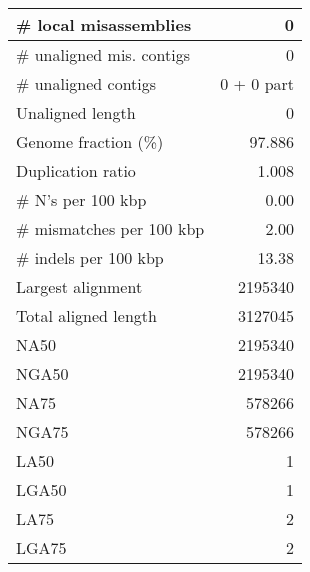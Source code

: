\documentclass[12pt,a4paper]{article}
\begin{document}
\begin{table}[ht]
\begin{center}
\begin{tabular}{|l*{1}{|r}|}
\# local misassemblies & 0 \\ \hline
\# unaligned mis. contigs & 0 \\ \hline
\# unaligned contigs & 0 + 0 part \\ \hline
Unaligned length & 0 \\ \hline
Genome fraction (\%) & 97.886 \\ \hline
Duplication ratio & 1.008 \\ \hline
\# N's per 100 kbp & 0.00 \\ \hline
\# mismatches per 100 kbp & 2.00 \\ \hline
\# indels per 100 kbp & 13.38 \\ \hline
Largest alignment & 2195340 \\ \hline
Total aligned length & 3127045 \\ \hline
NA50 & 2195340 \\ \hline
NGA50 & 2195340 \\ \hline
NA75 & 578266 \\ \hline
NGA75 & 578266 \\ \hline
LA50 & 1 \\ \hline
LGA50 & 1 \\ \hline
LA75 & 2 \\ \hline
LGA75 & 2 \\ \hline
\end{tabular}
\end{center}
\end{table}
\end{document}
